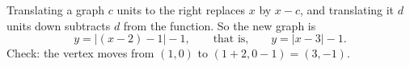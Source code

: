 Translating a graph $c$ units to the right replaces $x$ by $x-c$, and translating it $d$ units down subtracts $d$ from the function. So the new graph is
\[
y=|(x-2)-1|-1,\qquad\text{that is,}\qquad \boxed{y=|x-3|-1}.
\]
Check: the vertex moves from $(1,0)$ to $(1+2,0-1)=(3,-1)$.
